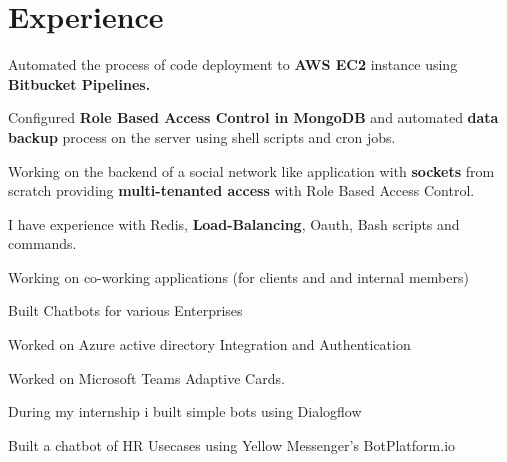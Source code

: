 \documentclass[]{deedy-resume-openfont}
\begin{document}
\hfill
\begin{minipage}[t]{0.66\textwidth} 


\section{Experience}

\vspace{\topsep} %
\begin{tightemize}
\item Automated the process of code deployment to \textbf{AWS EC2} instance using \textbf{Bitbucket Pipelines.}
\item Configured \textbf{Role Based Access Control in MongoDB} and automated \textbf{data backup} process on the server using shell scripts and cron jobs.
\item Working on the backend of a social network like application with \textbf{sockets} from scratch providing \textbf{multi-tenanted access} with Role Based Access Control.
\item I have experience with Redis, \textbf{Load-Balancing}, Oauth, Bash scripts and commands.
\item Working on co-working applications (for clients and and internal members)

\end{tightemize}
\sectionsep

\descript{  }
\begin{tightemize}
\item Built Chatbots for various Enterprises
\item Worked on Azure active directory Integration and Authentication
\item Worked on Microsoft Teams Adaptive Cards.
\end{tightemize}

\begin{tightemize}
\item During my internship i built simple bots using Dialogflow
\item Built a chatbot of HR Usecases using Yellow Messenger's BotPlatform.io
\end{tightemize}
\sectionsep


\end{minipage}
\end{document}

